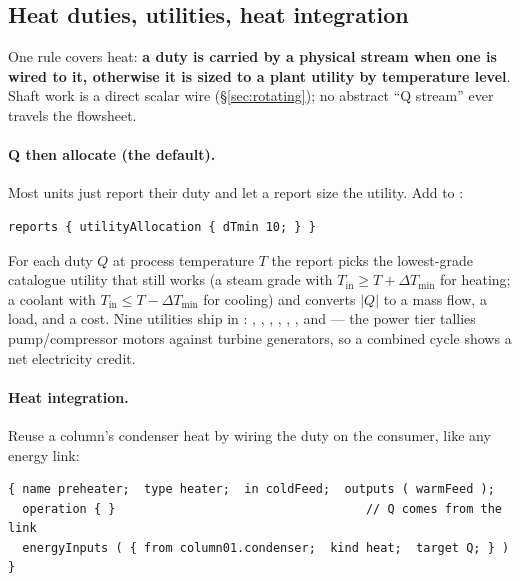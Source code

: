 \documentclass[11pt,a4paper]{article}
\begin{document}
\subsection{Heat duties, utilities, heat integration}\label{sec:energy-utilities}

One rule covers heat: \textbf{a duty is carried by a physical stream
when one is wired to it, otherwise it is sized to a plant utility by
temperature level}.  Shaft work is a direct scalar wire
(\S\ref{sec:rotating}); no abstract ``Q stream'' ever travels the
flowsheet.

\paragraph{Q then allocate (the default).}  Most units just report
their duty and let a report size the utility.  Add to
:

\begin{lstlisting}[language=dict]
reports { utilityAllocation { dTmin 10; } }
\end{lstlisting}

For each duty $Q$ at process temperature $T$ the report picks the
lowest-grade catalogue utility that still works (a steam grade with
$T_{\mathrm{in}} \ge T + \Delta T_{\min}$ for heating; a coolant with
$T_{\mathrm{in}} \le T - \Delta T_{\min}$ for cooling) and converts
$|Q|$ to a mass flow, a load, and a cost.  Nine utilities ship in
: ,
, , ,
, , and  ---
the power tier tallies pump/compressor motors against turbine
generators, so a combined cycle shows a net electricity credit.

\paragraph{Heat integration.}  Reuse a column's condenser heat by
wiring the duty on the consumer, like any energy link:

\begin{lstlisting}[language=dict]
{ name preheater;  type heater;  in coldFeed;  outputs ( warmFeed );
  operation { }                                   // Q comes from the link
  energyInputs ( { from column01.condenser;  kind heat;  target Q; } ) }
\end{lstlisting}
\end{document}
